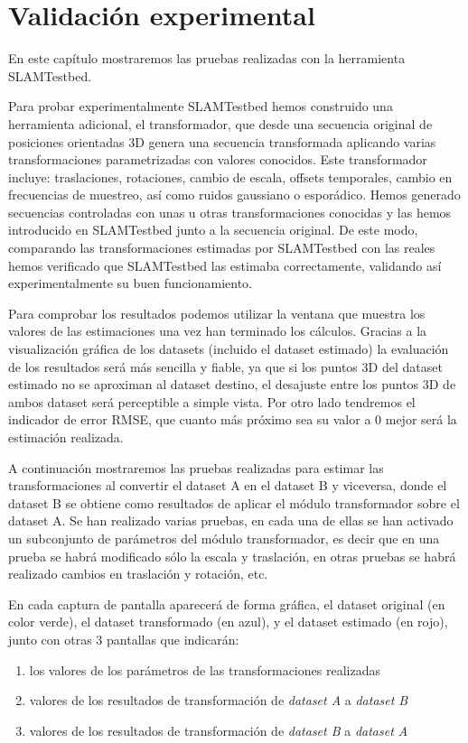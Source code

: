 \newpage
\chapter{Validación experimental} \label{cap:experimentos}
En este capítulo mostraremos las pruebas realizadas con la herramienta SLAMTestbed.

Para probar experimentalmente SLAMTestbed hemos construido una herramienta adicional, el transformador, que desde una secuencia original de posiciones orientadas 3D genera una secuencia transformada aplicando varias transformaciones parametrizadas con valores conocidos. Este transformador incluye: traslaciones, rotaciones, cambio de escala, offsets temporales, cambio en frecuencias de muestreo, así como ruidos gaussiano o esporádico.
Hemos generado secuencias controladas con unas u otras transformaciones conocidas y las hemos introducido en SLAMTestbed junto a la secuencia original. De este modo, comparando las transformaciones estimadas por SLAMTestbed con las reales hemos verificado que SLAMTestbed las estimaba correctamente, validando así experimentalmente su buen funcionamiento.

Para comprobar los resultados podemos utilizar la ventana que muestra los valores de las estimaciones una vez han terminado los cálculos. Gracias a la visualización gráfica de los datasets (incluido el dataset estimado) la evaluación de los resultados será más sencilla y fiable, ya que si los puntos 3D del dataset estimado no se aproximan al dataset destino, el desajuste entre los puntos 3D de ambos dataset será perceptible a simple vista. 
Por otro lado tendremos el indicador de error RMSE, que cuanto más próximo sea su valor a 0 mejor será la estimación realizada.

A continuación mostraremos las pruebas realizadas para estimar las transformaciones al convertir el dataset A en el dataset B y viceversa, donde el dataset B se obtiene como resultados de aplicar el módulo transformador sobre el dataset A.
Se han realizado varias pruebas, en cada una de ellas se han activado un subconjunto de parámetros del módulo transformador, es decir que en una prueba se habrá modificado sólo la escala y traslación, en otras pruebas se habrá realizado cambios en traslación y rotación, etc.

En cada captura de pantalla aparecerá de forma gráfica, el dataset original (en color verde), el dataset transformado (en azul), y el dataset estimado (en rojo), junto con otras 3 pantallas que indicarán:
\begin{enumerate}
 \item{los valores de los parámetros de las transformaciones realizadas} 
 \item{valores de los resultados de transformación de \textit{dataset A} a \textit{dataset B}}
 \item{valores de los resultados de transformación de \textit{dataset B} a \textit{dataset A}}
\end{enumerate}

